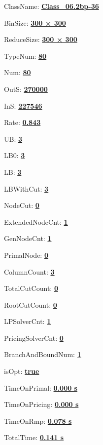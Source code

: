 \documentclass[11pt]{article}
\begin{document}
\pagestyle{empty}


ClassName: \underline{\textbf{Class_06.2bp-36}}
\par
BinSize: \underline{\textbf{300 × 300}}
\par
ReduceSize: \underline{\textbf{300 × 300}}
\par
TypeNum: \underline{\textbf{80}}
\par
Num: \underline{\textbf{80}}
\par
OutS: \underline{\textbf{270000}}
\par
InS: \underline{\textbf{227546}}
\par
Rate: \underline{\textbf{0.843}}
\par
UB: \underline{\textbf{3}}
\par
LB0: \underline{\textbf{3}}
\par
LB: \underline{\textbf{3}}
\par
LBWithCut: \underline{\textbf{3}}
\par
NodeCut: \underline{\textbf{0}}
\par
ExtendedNodeCnt: \underline{\textbf{1}}
\par
GenNodeCnt: \underline{\textbf{1}}
\par
PrimalNode: \underline{\textbf{0}}
\par
ColumnCount: \underline{\textbf{3}}
\par
TotalCutCount: \underline{\textbf{0}}
\par
RootCutCount: \underline{\textbf{0}}
\par
LPSolverCnt: \underline{\textbf{1}}
\par
PricingSolverCnt: \underline{\textbf{0}}
\par
BranchAndBoundNum: \underline{\textbf{1}}
\par
isOpt: \underline{\textbf{true}}
\par
TimeOnPrimal: \underline{\textbf{0.000 s}}
\par
TimeOnPricing: \underline{\textbf{0.000 s}}
\par
TimeOnRmp: \underline{\textbf{0.078 s}}
\par
TotalTime: \underline{\textbf{0.141 s}}
\par
\newpage
\end{document}
